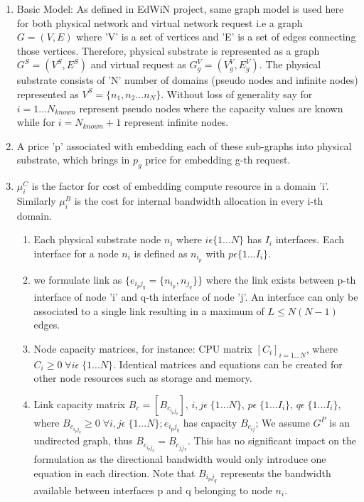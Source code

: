 \documentclass[article,dr=phil,type=msc ,colorback,accentcolor=tud4b]{tudthesis}
\begin{document}
\begin{enumerate}[label=(\Alph*)]
\item  Basic Model: As defined in EdWiN project, same graph model is used here for both physical network and virtual network request i.e a graph $G= (V, E)$ where 'V' is a set of vertices and 'E' is a set of edges connecting those vertices. Therefore, physical substrate is represented as a graph $G^{S} = (V^{S}, E^{S})$ and virtual request as $G^{V}_{g} = (V^{V}_{g}, E^{V}_{g})$. The physical substrate consists of 'N' number of domains (pseudo nodes and infinite nodes) represented as $V^{S} = \{n_{1},n_{2}...n_{N}\}$. Without loss of generality say for $i = 1...N_{known}$ represent pseudo nodes where the capacity values are known while for $i = N_{known} + 1$ represent infinite nodes. 

\item A price 'p' associated with embedding each of these sub-graphs into physical substrate, which brings in $p_{g}$ price for embedding g-th request.

\item $\mu_{i}^{C}$ is the factor for cost of embedding compute resource in a domain 'i'. Similarly $\mu_{i}^{B}$ is the cost for internal bandwidth allocation in every i-th domain.

\begin{enumerate}
\item Each physical substrate node $n_{i}$ where $i \epsilon \{1...N\}$ has $I_{i}$ interfaces. Each interface for a node $n_{i}$ is defined as $n_{i_{p}}$ with $p \epsilon \{1...I_{i}\}$. 

\item we formulate link as $\{e_{i_{p}j_{q}} = \{ n_{i_{p}}, n_{j_{q}}\}  \}$ where the link exists between p-th interface of node 'i' and q-th interface of node 'j'. An interface can only be associated to a single link resulting in a maximum of $L \leq N(N-1)$ edges. 

\item Node capacity matrices, for instance: CPU matrix $[ C_{i}]_{i = 1...N}$, where $C_{i} \ge 0 \; \forall i\epsilon \; \{1...N\}$. Identical matrices and equations can be created for other node resources such as storage and memory. 

\item Link capacity matrix $B_{c} = [B_{c_{i_{p}j_{q}}}]$, $ i, j \epsilon \; \{1...N\}$, $ p \epsilon \; \{1...I_{i}\}$, $ q \epsilon \; \{1...I_{i}\}$, where $ B_{c_{i_{p}j_{q}}} \geq 0  \; \forall  i, j \epsilon \; \{1...N\}; e_{i_{p}j_{q}} $ has capacity $B_{c_{ij}}$; We assume $G^{P}$ is an undirected graph, thus $B_{c_{i_{p}j_{q}}} = B_{c_{j_{q}i_{p}}}$. This has no significant impact on the formulation as the directional bandwidth would only introduce one equation in each direction. Note that $B_{i_{p}j_{q}}$ represents the bandwidth available between interfaces p and q belonging to node $n_{i}$.
\end{enumerate}


\end{enumerate}
\end{document}
